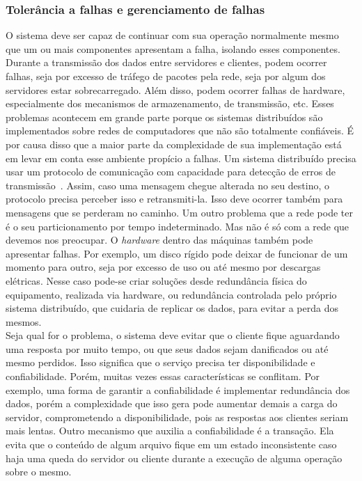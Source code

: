 	\subsubsection{Tolerância a falhas e gerenciamento de falhas}
	O sistema deve ser capaz de continuar com sua operação normalmente mesmo que um ou mais componentes apresentam a falha, isolando esses componentes.
	Durante a transmissão dos dados entre servidores e clientes, podem ocorrer falhas, seja por excesso de tráfego de pacotes pela rede, seja por algum dos servidores estar sobrecarregado. Além disso, podem ocorrer falhas de hardware, especialmente dos mecanismos de armazenamento, de transmissão, etc. Esses problemas acontecem em grande parte porque os sistemas distribuídos são implementados sobre redes de computadores que não são totalmente confiáveis. É por causa disso que a maior parte da complexidade de sua implementação está em levar em conta esse ambiente propício a falhas. Um sistema distribuído precisa usar um protocolo de comunicação com capacidade para detecção de erros de transmissão~\cite{kon94}. Assim, caso uma mensagem chegue alterada no seu destino, o protocolo precisa perceber isso e retransmiti-la. Isso deve ocorrer também para mensagens que se perderam no caminho.
	Um outro problema que a rede pode ter é o seu particionamento por tempo indeterminado. Mas não é só com a rede que devemos nos preocupar. O \textit{hardware} dentro das máquinas também pode apresentar falhas. Por exemplo, um disco rígido pode deixar de funcionar de um momento para outro, seja por excesso de uso ou até mesmo por descargas elétricas. Nesse caso pode-se criar soluções desde redundância física do equipamento, realizada via hardware, ou redundância controlada pelo próprio sistema distribuído, que cuidaria de replicar os dados, para evitar a perda dos mesmos.\\
	 
	Seja qual for o problema, o sistema deve evitar que o cliente fique aguardando uma resposta por muito tempo, ou que seus dados sejam danificados ou até mesmo perdidos. Isso significa que o serviço precisa ter disponibilidade e confiabilidade.
	Porém, muitas vezes essas características se conflitam. Por exemplo, uma forma de garantir a confiabilidade é implementar redundância dos dados, porém a complexidade que isso gera pode aumentar demais a carga do servidor, comprometendo a disponibilidade, pois as respostas aos clientes seriam mais lentas.
	Outro mecanismo que auxilia a confiabilidade é a transação. Ela evita que o conteúdo de algum arquivo fique em um estado inconsistente caso haja uma queda do servidor ou cliente durante a execução de alguma operação sobre o mesmo.
	\\
	
